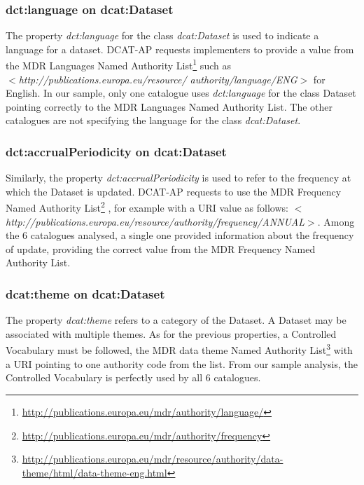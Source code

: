 \documentclass[<options>]{elsarticle}
\begin{document}
\subsubsection{dct:language on dcat:Dataset}
The property \textit{dct:language} for the class \textit{dcat:Dataset} is used to indicate a language for a dataset. DCAT-AP requests implementers to provide a value from the MDR Languages Named Authority List\footnote{\href{   http://publications.europa.eu/mdr/authority/language/}{    http://publications.europa.eu/mdr/authority/language/}} such as \\
\textit{$<$http://publications.europa.eu/resource/ authority/language/ENG$>$} for English. In our sample, only one catalogue uses \textit{dct:language} for the class Dataset pointing correctly to the MDR Languages Named Authority List. The other catalogues are not specifying the language for the class \textit{dcat:Dataset}.

\subsubsection{dct:accrualPeriodicity on dcat:Dataset}
Similarly, the property \textit{dct:accrualPeriodicity} is used to refer to the frequency at which the Dataset is updated. DCAT-AP requests to use the MDR Frequency Named Authority List\footnote{\href{    http://publications.europa.eu/mdr/authority/frequency}{     http://publications.europa.eu/mdr/authority/frequency}} , for example with a URI value as follows: \textit{$<$http://publications.europa.eu/resource/authority/frequency/ANNUAL$>$}. Among the 6 catalogues analysed, a single one provided information about the frequency of update, providing the correct value from the MDR Frequency Named Authority List.

\subsubsection{dcat:theme on dcat:Dataset}

The property \textit{dcat:theme }refers to a category of the Dataset. A Dataset may be associated with multiple themes. As for the previous properties, a Controlled Vocabulary must be followed, the MDR data theme Named Authority List\footnote{\href{     http://publications.europa.eu/mdr/resource/authority/data-theme/html/data-theme-eng.html}{      http://publications.europa.eu/mdr/resource/authority/data-theme/html/data-theme-eng.html}}  with a URI pointing to one authority code from the list. From our sample analysis, the Controlled Vocabulary is perfectly used by all 6 catalogues.
\end{document}
